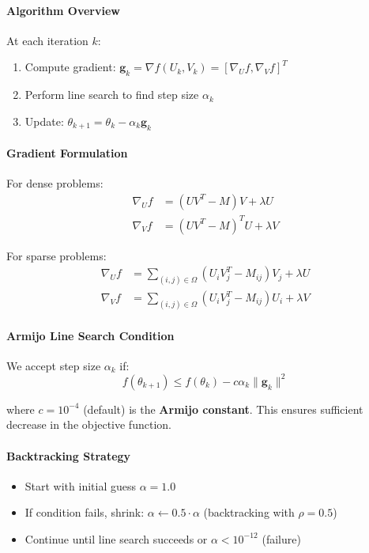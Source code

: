 \documentclass[11pt,oneside]{article}
\newcommand{\defn}[1]{\textbf{#1}}
\newcommand{\grad}{\nabla}
\begin{document}
\paragraph{Algorithm Overview}

At each iteration $k$:
\begin{enumerate}
    \item Compute gradient: $\mathbf{g}_k = \grad f(U_k, V_k) = [\grad_U f, \grad_V f]^T$
    \item Perform line search to find step size $\alpha_k$
    \item Update: $\theta_{k+1} = \theta_k - \alpha_k \mathbf{g}_k$
\end{enumerate}

\paragraph{Gradient Formulation}

For dense problems:
\begin{align}
    \grad_U f &= (UV^T - M)V + \lambda U \\
    \grad_V f &= (UV^T - M)^T U + \lambda V
\end{align}

For sparse problems:
\begin{align}
    \grad_U f &= \sum_{(i,j) \in \Omega} (U_i V_j^T - M_{ij})V_j + \lambda U \\
    \grad_V f &= \sum_{(i,j) \in \Omega} (U_i V_j^T - M_{ij})U_i + \lambda V
\end{align}

\paragraph{Armijo Line Search Condition}

We accept step size $\alpha_k$ if:
\begin{equation}
    f(\theta_{k+1}) \leq f(\theta_k) - c \alpha_k \|\mathbf{g}_k\|^2
\end{equation}

where $c = 10^{-4}$ (default) is the \defn{Armijo constant}. This ensures sufficient decrease in the objective function.

\paragraph{Backtracking Strategy}

\begin{itemize}
    \item Start with initial guess $\alpha = 1.0$
    \item If condition fails, shrink: $\alpha \leftarrow 0.5 \cdot \alpha$ (backtracking with $\rho = 0.5$)
    \item Continue until line search succeeds or $\alpha < 10^{-12}$ (failure)
\end{itemize}
\end{document}
